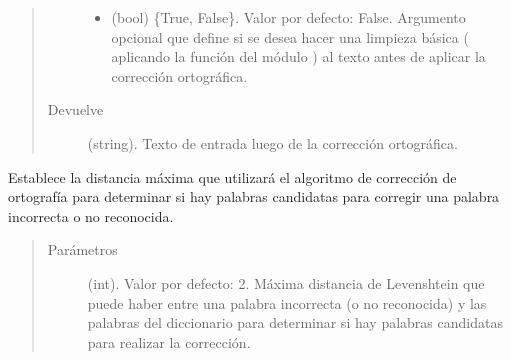\documentclass[letterpaper,10pt,openany,spanish]{sphinxmanual}
\begin{document}
\begin{fulllineitems}
\begin{fulllineitems}
\begin{quote}
\begin{description}
\begin{itemize}
\item {} 
 \textendash{} (bool) \{True, False\}. Valor por defecto: False. Argumento             opcional que define si se desea hacer una limpieza básica (            aplicando la función  del módulo ) al             texto antes de aplicar la corrección ortográfica.

\end{itemize}

\item[{Devuelve}] \leavevmode
(string). Texto de entrada luego de la corrección ortográfica.

\end{description}\end{quote}

\end{fulllineitems}


\begin{fulllineitems}
\label{\detokenize{funciones/correccion:correccion.Corrector.establecer_distancia}}
Establece la distancia máxima que utilizará el algoritmo de corrección de ortografía         para determinar si hay palabras candidatas para corregir una palabra incorrecta o         no reconocida.
\begin{quote}\begin{description}
\item[{Parámetros}] \leavevmode
{} \textendash{} (int). Valor por defecto: 2. Máxima distancia de Levenshtein que puede haber 
entre una palabra incorrecta (o no reconocida) y las palabras del diccionario para             determinar si hay palabras candidatas para realizar la corrección.

\end{description}\end{quote}

\end{fulllineitems}



\end{fulllineitems}
\end{document}
